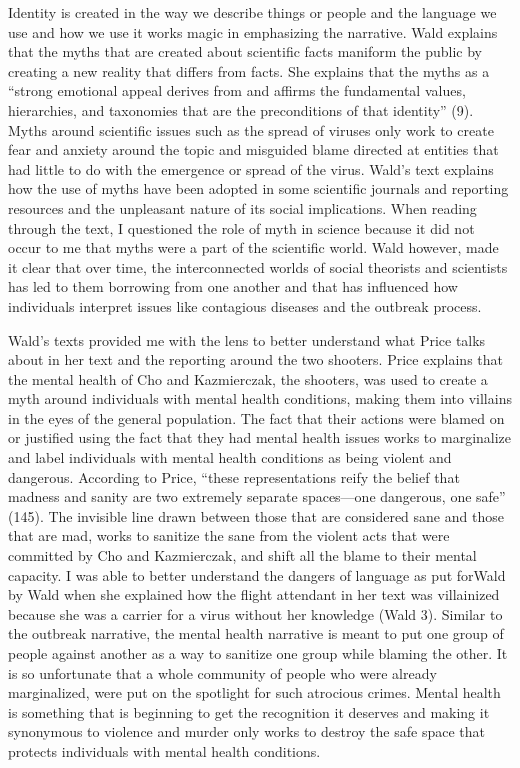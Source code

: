 \documentclass[11pt]{article}
\begin{document}
Identity is created in the way we describe things or people and the language we use and how we use it works magic in emphasizing the narrative. Wald explains that the myths that are created about scientific facts maniform the public by creating a new reality that differs from facts. She explains that the myths as a “strong emotional appeal derives from and affirms the fundamental values, hierarchies, and taxonomies that are the preconditions of that identity” (9). Myths around scientific issues such as the spread of viruses only work to create fear and anxiety around the topic and misguided blame directed at entities that had little to do with the emergence or spread of the virus. Wald’s text explains how the use of myths have been adopted in some scientific journals and reporting resources and the unpleasant nature of its social implications. When reading through the text, I questioned the role of myth in science because it did not occur to me that myths were a part of the scientific world. Wald however, made it clear that over time, the interconnected worlds of social theorists and scientists has led to them borrowing from one another and that has influenced how individuals interpret issues like contagious diseases and the outbreak process.

Wald’s texts provided me with the lens to better understand what Price talks about in her text and the reporting around the two shooters. Price explains that the mental health of Cho and Kazmierczak, the shooters, was used to create a myth around individuals with mental health conditions, making them into villains in the eyes of the general population. The fact that their actions were blamed on or justified using the fact that they had mental health issues works to marginalize and label individuals with mental health conditions as being violent and dangerous. According to Price, “these representations reify the belief that madness and sanity are two extremely separate spaces—one dangerous, one safe” (145). The invisible line drawn between those that are considered sane and those that are mad, works to sanitize the sane from the violent acts that were committed by Cho and Kazmierczak, and shift all the blame to their mental capacity. I was able to better understand the dangers of language as put forWald by Wald when she explained how the flight attendant in her text was villainized because she was a carrier for a virus without her knowledge (Wald 3). Similar to the outbreak narrative, the mental health narrative is meant to put one group of people against another as a way to sanitize one group while blaming the other. It is so unfortunate that a whole community of people who were already marginalized, were put on the spotlight for such atrocious crimes. Mental health is something that is beginning to get the recognition it deserves and making it synonymous to violence and murder only works to destroy the safe space that protects individuals with mental health conditions.
\end{document}
